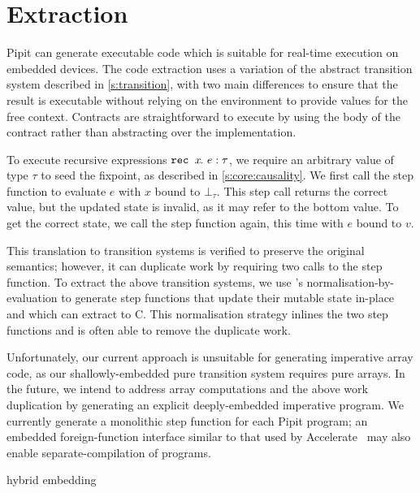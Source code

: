 

\section{Extraction}
\label{s:extraction}

Pipit can generate executable code which is suitable for real-time execution on embedded devices.
The code extraction uses a variation of the abstract transition system described in \autoref{s:transition}, with two main differences to ensure that the result is executable without relying on the environment to provide values for the free context.
Contracts are straightforward to execute by using the body of the contract rather than abstracting over the implementation.

To execute recursive expressions $\texttt{rec~} x\hspace{-0.1em}.~e : \tau$, we require an arbitrary value of type $\tau$ to seed the fixpoint, as described in \autoref{s:core:causality}.
We first call the step function to evaluate $e$ with $x$ bound to $\bot_\tau$.
This step call returns the correct value, but the updated state is invalid, as it may refer to the bottom value.
To get the correct state, we call the step function again, this time with $e$ bound to $v$.

This translation to transition systems is verified to preserve the original semantics; however, it can duplicate work by requiring two calls to the step function.
To extract the above transition systems, we use \fstar{}'s normalisation-by-evaluation to generate step functions that update their mutable state in-place and which \lowstar{} can extract to C.
This normalisation strategy inlines the two step functions and is often able to remove the duplicate work.

Unfortunately, our current approach is unsuitable for generating imperative array code, as our shallowly-embedded pure transition system requires pure arrays.
In the future, we intend to address array computations and the above work duplication by generating an explicit deeply-embedded imperative program.
We currently generate a monolithic step function for each Pipit program; an embedded foreign-function interface similar to that used by Accelerate~\cite{clifton2014embedding} may also enable separate-compilation of programs.

 \cite{ho2022noise} hybrid embedding